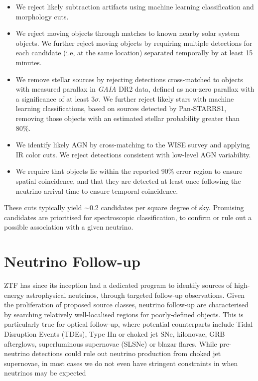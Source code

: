 \begin{itemize}
	\item We reject likely subtraction artifacts using machine learning classification and morphology cuts\cite{2019PASP..131c8002M}.
	\item We reject moving objects through matches to known nearby solar system objects\cite{2019PASP..131a8003M}. We further reject moving objects by requiring multiple  detections for each candidate (i.e, at the same location) separated temporally by at least 15 minutes.
	\item We remove stellar sources by rejecting detections cross-matched\cite{2018PASP..130g5002S} to objects with measured parallax in \textit{GAIA} DR2 data\cite{2018A&A...616A...1G}, defined as non-zero parallax with a significance of at least 3$\sigma$. We further reject likely stars with machine learning classifications\cite{2018PASP..130l8001T}, based on sources detected by Pan-STARRS1\cite{2016arXiv161205560C}, removing those objects with an estimated stellar probability greater than 80\%.
	\item We identify likely AGN by cross-matching to the WISE survey and applying IR color cuts\cite{2010AJ....140.1868W}. We reject detections consistent with low-level AGN variability. 
	\item We require that objects lie within the reported 90\% error region to ensure spatial coincidence, and that they are detected at least once following the neutrino arrival time to ensure temporal coincidence.
\end{itemize}

These cuts typically yield $\sim$0.2 candidates per square degree of sky. Promising candidates are prioritised for spectroscopic classification, to confirm or rule out a possible association with a given neutrino. 

\section{Neutrino Follow-up}
ZTF has since its inception had a dedicated program to identify sources of high-energy astrophysical neutrinos, through targeted follow-up observations. Given the proliferation of proposed source classes, neutrino follow-up are characterised by searching relatively well-localised regions for poorly-defined objects. This is particularly true for optical follow-up, where potential counterparts include Tidal Disruption Events (TDEs), Type IIn or choked jet SNe, kilonovae, GRB afterglows, superluminous supernovae (SLSNe) or blazar flares. While pre-neutrino detections could rule out neutrino production from choked jet supernovae, in most cases we do not even have stringent constraints in when neutrinos may be expected 

